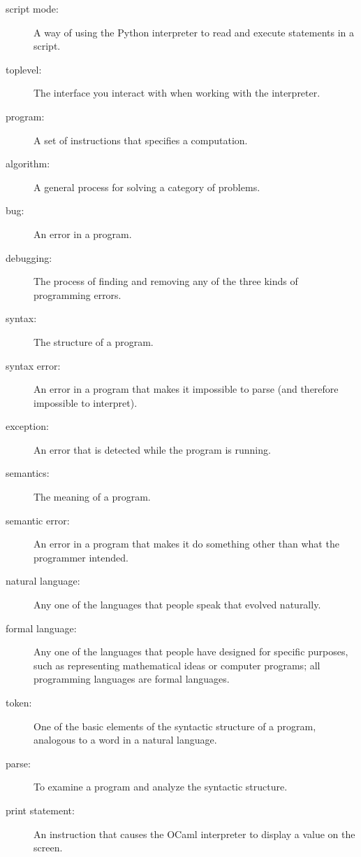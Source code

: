 \documentclass[10pt]{book}
\begin{document}
\begin{description}
\item[script mode:] A way of using the Python interpreter to read
and execute statements in a script.

\item[toplevel:] The interface you interact with when working with the interpreter.

\item[program:] A set of instructions that specifies a computation.

\item[algorithm:]  A general process for solving a category of
problems.

\item[bug:]  An error in a program.

\item[debugging:]  The process of finding and removing any of the
three kinds of programming errors.

\item[syntax:]  The structure of a program.

\item[syntax error:]  An error in a program that makes it impossible
to parse (and therefore impossible to interpret).

\item[exception:]  An error that is detected while the program is running.

\item[semantics:]  The meaning of a program.

\item[semantic error:]   An error in a program that makes it do something
other than what the programmer intended.

\item[natural language:]  Any one of the languages that people speak that
evolved naturally.

\item[formal language:]  Any one of the languages that people have designed
for specific purposes, such as representing mathematical ideas or
computer programs; all programming languages are formal languages.

\item[token:]  One of the basic elements of the syntactic structure of
a program, analogous to a word in a natural language.

\item[parse:]  To examine a program and analyze the syntactic structure.

\item[print statement:]  An instruction that causes the OCaml
interpreter to display a value on the screen.


\end{description}
\end{document}
